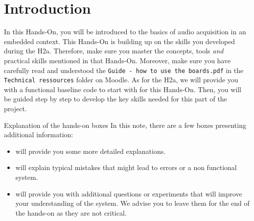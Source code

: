 \section*{Introduction}

In this Hands-On, you will be introduced to the basics of audio acquisition in an embedded context. This Hands-On is building up on the skills you developed during the H2a. Therefore, make sure you master the concepts, tools \textit{and} practical skills mentioned in that Hands-On. Moreover, make sure you have carefully read and understood the \texttt{Guide - how to use the boards.pdf} in the \texttt{Technical ressources} folder on Moodle. As for the H2a, we will provide you with a functional baseline code to start with for this Hands-On. Then, you will be guided step by step to develop the key skills needed for this part of the project.

\begin{bclogo}[couleur = gray!20, arrondi = 0.2, logo=\bcinfo]{Explanation of the hands-on boxes}
In this note, there are a few boxes presenting additional information:
\begin{itemize}
    \item \bcinfo will provide you some more detailed explanations.
    \item \bcattention will explain typical mistakes that might lead to errors or a non functional system.
    \item \bcquestion will provide you with additional questions or experiments that will improve your understanding of the system. We advise you to leave them for the end of the hands-on as they are not critical.
\end{itemize}
\end{bclogo}
